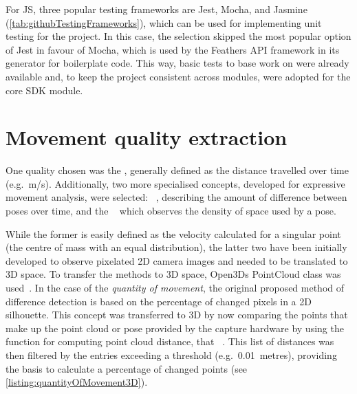 For \ac{JS}, three popular testing frameworks are Jest, Mocha, and Jasmine (\ref{tab:githubTestingFrameworks}), which can be used for implementing unit testing for the project.
In this case, the selection skipped the most popular option of Jest in favour of Mocha, which is used by the Feathers \ac{API} framework in its generator for boilerplate code.
This way, basic tests to base work on were already available and, to keep the project consistent across modules, were adopted for the core \ac{SDK} module.



\section{Movement quality extraction}
\label{sec:movement-quality-extraction}

One quality chosen was the , generally defined as the distance travelled over time (e.g.\ m/s).
Additionally, two more specialised concepts, developed for expressive movement analysis, were selected: ~\parencite[96-97]{movementQualities}, describing the amount of difference between poses over time, and the ~\parencite[97]{movementQualities} which observes the density of space used by a pose.

While the former is easily defined as the velocity calculated for a singular point (the centre of mass with an equal distribution), the latter two have been initially developed to observe pixelated \ac{2D} camera images and needed to be translated to \ac{3D} space.
To transfer the methods to \ac{3D} space, Open3D\textquotesingle s PointCloud class was used~\parencite{open3DPointCloudReference}.
In the case of the \emph{quantity of movement}, the original proposed method of difference detection is based on the percentage of changed pixels in a \ac{2D} silhouette.
This concept was transferred to \ac{3D} by now comparing the points that make up the point cloud or pose provided by the capture hardware by using the function for computing point cloud distance, that ~\parencite{open3DPointCloudReference}.
This list of distances was then filtered by the entries exceeding a threshold (e.g.\ 0.01~metres), providing the basis to calculate a percentage of changed points (see \autoref{listing:quantityOfMovement3D}).


